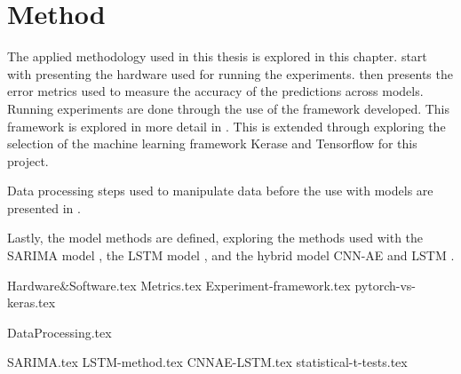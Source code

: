 \chapter{Method}
\label{section:Method}

The applied methodology used in this thesis is explored in this chapter.
 start with presenting the hardware used for running the experiments.
 then presents the error metrics used to measure the accuracy of the predictions across models.
Running experiments are done through the use of the framework developed. This framework is explored in more detail in .
This is extended through  exploring the selection of the machine learning framework Kerase and Tensorflow for this project.

Data processing steps used to manipulate data before the use with models are presented in .

Lastly, the model methods are defined, exploring the methods used with the SARIMA model , the LSTM model ,
and the hybrid model CNN-AE and LSTM .


{Hardware&Software.tex}
{Metrics.tex}
{Experiment-framework.tex}
{pytorch-vs-keras.tex}

{DataProcessing.tex}

{SARIMA.tex}
{LSTM-method.tex}
{CNNAE-LSTM.tex}
{statistical-t-tests.tex}
